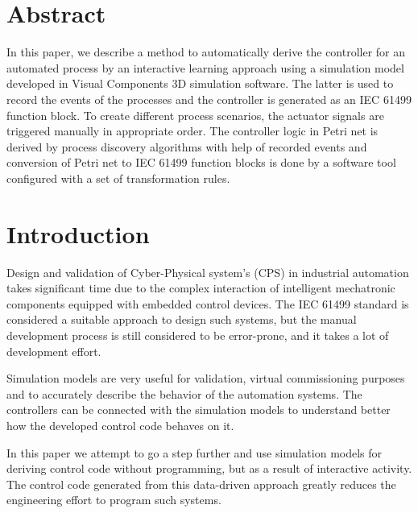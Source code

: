 \begin{bibunit}
\thispagestyle{plain}

\newcommand \op[1] {\ensuremath{\operatorname{\mathbf{#1}}}}
\newcommand \com[1] {\ensuremath{\mathtt{#1}}}
\newcommand{\RNum}[1]{\uppercase\expandafter{\romannumeral #1\relax}}

\section*{Abstract}

In this paper, we describe a method to automatically derive the controller for an automated process by an interactive learning approach using a simulation model developed in Visual Components 3D simulation software. The latter is used to record the events of the processes and the controller is generated as an IEC 61499 function block. To create different process scenarios, the actuator signals are triggered manually in appropriate order. The controller logic in Petri net is derived by process discovery algorithms with help of recorded events and conversion of Petri net to IEC 61499 function blocks is done by a software tool configured with a set of transformation rules.
  

\section{Introduction}

Design and validation of Cyber-Physical system’s (CPS) \cite{lee2017introduction}  in industrial automation takes significant time due to the complex interaction of intelligent mechatronic components equipped with embedded control devices. The IEC 61499 standard \cite{iec61499part12012} is considered a suitable approach to design such systems, but the manual development process is still considered to be error-prone, and it takes a lot of development effort. 

Simulation models are very useful for validation, virtual commissioning purposes and to accurately describe the behavior of the automation systems. The controllers can be connected with the simulation models to understand better how the developed control code behaves on it.

In this paper we attempt to go a step further and use simulation models for deriving control code without programming, but as a result of interactive activity. The control code generated from this data-driven approach greatly reduces the engineering effort to program such systems.


\end{bibunit}
